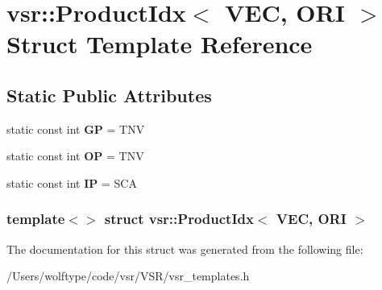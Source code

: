 \hypertarget{structvsr_1_1_product_idx_3_01_v_e_c_00_01_o_r_i_01_4}{\section{vsr\-:\-:Product\-Idx$<$ V\-E\-C, O\-R\-I $>$ Struct Template Reference}
\label{structvsr_1_1_product_idx_3_01_v_e_c_00_01_o_r_i_01_4}
}
\subsection*{Static Public Attributes}
\begin{DoxyCompactItemize}
\item 
\hypertarget{structvsr_1_1_product_idx_3_01_v_e_c_00_01_o_r_i_01_4_afa7f300efd5b8c51dff7280c75adcf0a}{static const int {\bfseries G\-P} = T\-N\-V}\label{structvsr_1_1_product_idx_3_01_v_e_c_00_01_o_r_i_01_4_afa7f300efd5b8c51dff7280c75adcf0a}

\item 
\hypertarget{structvsr_1_1_product_idx_3_01_v_e_c_00_01_o_r_i_01_4_a41586948f093bcc2656bce0e4bc2b8f1}{static const int {\bfseries O\-P} = T\-N\-V}\label{structvsr_1_1_product_idx_3_01_v_e_c_00_01_o_r_i_01_4_a41586948f093bcc2656bce0e4bc2b8f1}

\item 
\hypertarget{structvsr_1_1_product_idx_3_01_v_e_c_00_01_o_r_i_01_4_a5276d36075a59fd2cc2d78305fc9fbaf}{static const int {\bfseries I\-P} = S\-C\-A}\label{structvsr_1_1_product_idx_3_01_v_e_c_00_01_o_r_i_01_4_a5276d36075a59fd2cc2d78305fc9fbaf}

\end{DoxyCompactItemize}
\subsubsection*{template$<$$>$ struct vsr\-::\-Product\-Idx$<$ V\-E\-C, O\-R\-I $>$}



The documentation for this struct was generated from the following file\-:\begin{DoxyCompactItemize}
\item 
/\-Users/wolftype/code/vsr/\-V\-S\-R/vsr\-\_\-templates.\-h\end{DoxyCompactItemize}
